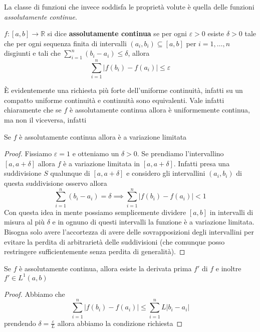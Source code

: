 La classe di funzioni che invece soddisfa le proprietà volute è quella delle
funzioni \emph{assolutamente continue}.  
\begin{definition}
    \(f : [a, b] \to \mathbb{R}\)  si dice \textbf{assolutamente continua} se per ogni
    \(\varepsilon > 0\) esiste \(\delta > 0\) tale che per ogni sequenza finita
    di intervalli \({(a_{i}, b_{i})} \subseteq [a, b] \) per \(i = 1,\dots, n\)
    disgiunti e tali che \(\displaystyle\sum_{i=1}^{n} {(b_{i} - a_{i})} \le
    \delta  \), allora
\[
    \sum_{i=1}^{n} \left| f{(b_{i})} - f{(a_{i})} \right| \le \varepsilon 
\]
\end{definition}
È evidentemente una richiesta più forte dell'uniforme continuità, infatti su un
compatto uniforme continuità e continuità sono equivalenti. Vale infatti
chiaramente che se \(f\) è assolutamente continua allora è uniformemente
continua, ma non il viceversa, infatti
\begin{proposition}
    Se \(f\) è assolutamente continua allora è a variazione limitata
\end{proposition}
\begin{proof}
Fissiamo \(\varepsilon = 1\) e otteniamo un \(\delta > 0\). Se prendiamo
l'intervallino \([a, a+ \delta]\) allora \(f\) è a variazione limitata in \([a,
a+\delta]\). Infatti presa una suddivisione \(S\) qualunque di \([a,
a+\delta]\) e considero gli intervallini \({(a_{i}, b_{i})}\) di questa
suddivisione osservo allora
\[
    \sum_{i=1}^{n} {(b_{i} - a_{i})} = \delta \implies \sum_{i=1}^{n} \left|
    f{(b_{i})} - f{(a_{i})} \right| < 1
\]
Con questa idea in mente possiamo semplicemente dividere \([a,b]\) in intervalli
di misura al più \(\delta\) e in ognuno di questi intervalli la funzione è a
variazione limitata. Bisogna solo avere l'accortezza di avere delle
sovrapposizioni degli intervallini per evitare la perdita di arbitrarietà delle
suddivisioni (che comunque posso restringere sufficientemente senza perdita di
generalità). 
\end{proof}
\begin{proposition}
    Se \(f\) è assolutamente continua, allora esiste la derivata prima \(f'\) di
    \(f\) e inoltre \(f' \in L^{1}(a, b)\) 
\end{proposition}
\begin{proposition}
\end{proposition}
\begin{proof}
    Abbiamo che
\[
    \sum_{i=1}^{n} \left| f{(b_{i})} - f{(a_{i})} \right| \le \sum_{i=1}^{n} L
    |b_{i} - a_{i}|  
\]
    prendendo \(\delta = \frac{\varepsilon}{L}\) allora abbiamo la condizione
    richiesta
\end{proof}

